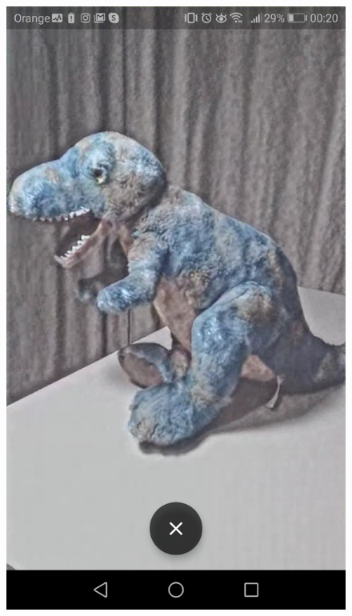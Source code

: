 \documentclass[../Main.tex]{subfiles}
\begin{document}
\begin{figure}[H]
        \includegraphics[width=\linewidth]{Images/app_photos/dino/draw.jpg}
    \endminipage\hfill

\end{figure}
\end{document}
